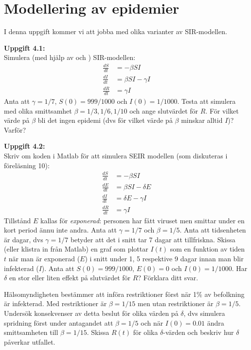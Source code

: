 
\section{Modellering av epidemier} 

I denna uppgift kommer vi att jobba med olika varianter av SIR-modellen.
 
\textbf{Uppgift 4.1:}\\  %
Simulera (med hjälp av  och  ) SIR-modellen:
$$\begin{aligned}\frac{dS}{dt} & = - \beta S I \\
\frac{dI}{dt} & = \beta S I -  \gamma I \\
\frac{dR}{dt} & =  \gamma I 
\end{aligned}$$
Anta att $\gamma=1/7$, $S(0)=999/1000$ och $I(0)=1/1000$. Testa att simulera med olika smittsamhet $\beta=1/3, 1/6, 1/10$ och ange slutvärdet för $R$. För vilket värde på $\beta$ bli det ingen epidemi (dvs för vilket värde på $\beta$ minskar alltid $I$)? Varför?



\textbf{Uppgift 4.2:}\\
Skriv om koden i Matlab för att simulera SEIR modellen (som diskuteras i föreläsning 10):
\[
\begin{aligned}
\frac{dS}{dt} & = - \beta S I \\
\frac{dE}{dt} & = \beta S I - \delta E\\
\frac{dI}{dt} & = \delta E -  \gamma I \\
\frac{dR}{dt} & =  \gamma I 
\end{aligned}
\]
Tillstånd $E$ kallas för \textit{exponerad}: personen har fått viruset men smittar under en kort period ännu inte andra. Anta att $\gamma=1/7$ och $\beta=1/5$.  Anta att tidsenheten är dagar, dvs $\gamma=1/7$ betyder att det i snitt tar 7 dagar att tillfriskna.  Skissa (eller klistra in från Matlab) en graf som plottar $I(t)$ som en funktion av tiden $t$ när man är exponerad ($E$) i snitt under 1, 5 respektive 9 dagar innan man blir infekterad ($I$). Anta att $S(0)=999/1000$, $E(0)=0$ och $I(0)=1/1000$. Har $\delta$ en stor eller liten effekt på slutvärdet för $R$? Förklara ditt svar.\\


Hälsomyndigheten bestämmer att införa restriktioner först när 1\% av befolkning är infekterad. Med restriktioner är $\beta=1/15$ men utan restriktioner är $\beta=1/5$. Undersök konsekvenser av detta beslut för olika värden på $\delta$, dvs simulera spridning först under antagandet att $\beta=1/5$ och när $I(0)=0.01$ ändra smittsamheten till $\beta=1/15$. Skissa $R(t)$ för olika $\delta$-värden och beskriv hur $\delta$ påverkar utfallet.\\

